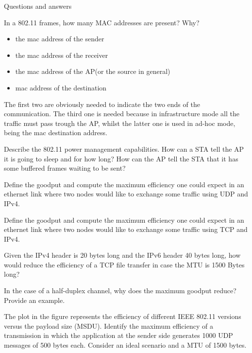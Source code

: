 \begin{section}{Questions and answers}
\begin{subsubsection}{In a 802.11 frames, how many MAC addresses are present? Why?}
\begin{itemize}
      \item the mac address of the sender
      \item the mac address of the receiver
      \item the mac address of the AP(or the source in general)
      \item mac address of the destination
    \end{itemize}
    The first two are obviously needed to indicate the two ends of the communication. The third one
    is needed because in infrastructure mode all the traffic must pass trough the AP, whilst the
    latter one is used in ad-hoc mode, being the mac destination address.
  \end{subsubsection}
  \begin{subsubsection}{Describe the 802.11 power management capabilities. How can a STA tell the AP
      it is going to sleep and for how long? How can the AP tell the STA that it has some buffered
    frames waiting to be sent?}
  \end{subsubsection}
  \begin{subsubsection}{Define the goodput and compute the maximum efficiency one could expect in an
    ethernet link where two nodes would like to exchange some traffic using UDP and IPv4.}
  \end{subsubsection}
  \begin{subsubsection}{Define the goodput and compute the maximum efficiency one could expect in an
    ethernet link where two nodes would like to exchange some traffic using TCP and IPv4.}
  \end{subsubsection}
  \begin{subsubsection}{Given the IPv4 header is 20 bytes long and the IPv6 header 40 bytes long,
    how would reduce the efficiency of a TCP file transfer in case the MTU is 1500 Bytes long?}
  \end{subsubsection}
  \begin{subsubsection}{In the case of a half-duplex channel, why does the maximum goodput reduce?
    Provide an example.}
  \end{subsubsection}
  \begin{subsubsection}{The plot in the figure represents the efficiency of different IEEE 802.11
      versions versus the payload size (MSDU). Identify the maximum efficiency of a transmission in
      which the application at the sender side generates 1000 UDP messages of 500 bytes each.
    Consider an ideal scenario and a MTU of 1500 bytes.}
  \end{subsubsection}
\end{section}
